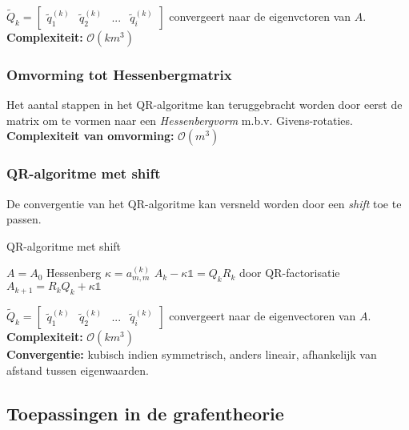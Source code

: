 \documentclass{article}
\begin{document}
	$\tilde{Q}_k = 
	\begin{bmatrix}
		\tilde{q}_1^{(k)} & \tilde{q}_2^{(k)} & ... & \tilde{q}_i^{(k)}
	\end{bmatrix}$ convergeert naar de eigenvctoren van $A$.\\
	
	
	\textbf{Complexiteit:} $\mathcal{O}(km^3)$
	
	\subsubsection{Omvorming tot Hessenbergmatrix}
	
	Het aantal stappen in het QR-algoritme kan teruggebracht worden door eerst de matrix om te vormen naar een \textit{Hessenbergvorm} m.b.v. Givens-rotaties.\\
		
	\textbf{Complexiteit van omvorming:} $\mathcal{O}(m^3)$
	
	\subsubsection{QR-algoritme met shift}
	
	De convergentie van het QR-algoritme kan versneld worden door een \textit{shift} toe te passen.
	
	\pagebreak
	
	\begin{algorithm}[!ht]
		\caption{QR-algoritme met shift}
		\begin{algorithmic}[1]
				\State $A=A_0$ Hessenberg
					\State $\kappa = a_{m,m}^{(k)}$
					\State $A_k - \kappa \mathbb{1} = Q_k R_k$ door QR-factorisatie
					\State $A_{k+1} = R_k Q_k + \kappa \mathbb{1}$
				\EndFor
			\EndProcedure
		\end{algorithmic}
	\end{algorithm}	
	$\tilde{Q}_k = 
	\begin{bmatrix}
	\tilde{q}_1^{(k)} & \tilde{q}_2^{(k)} & ... & \tilde{q}_i^{(k)}
	\end{bmatrix}$ convergeert naar de eigenvectoren van $A$.\\
	
	
	\textbf{Complexiteit:} $\mathcal{O}(km^3)$ \\
	\textbf{Convergentie:} kubisch indien symmetrisch, anders lineair, afhankelijk van afstand tussen eigenwaarden.
	
	\subsection{Toepassingen in de grafentheorie}
	
\end{document}
